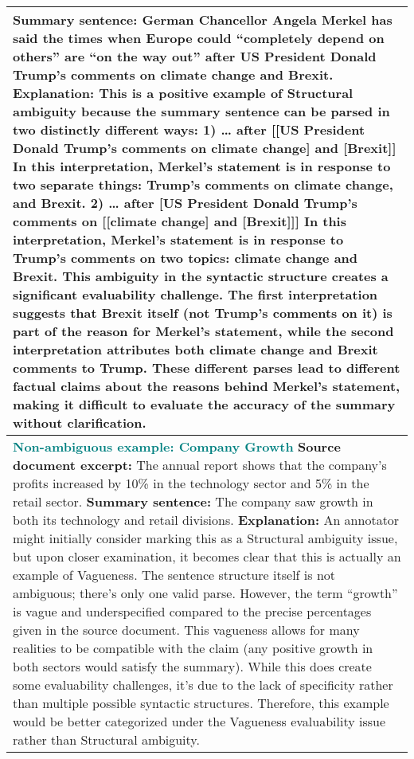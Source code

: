 \begin{table*}
\begin{tabular}{@{}p{14cm}@{}}
\newline
\textbf{Summary sentence:}
German Chancellor Angela Merkel has said the times when Europe could “completely depend on others” are “on the way out” after US President Donald Trump’s comments on climate change and Brexit.
\newline
\textbf{Explanation:}
This is a positive example of Structural ambiguity because the summary sentence can be parsed in two distinctly different ways: 1) … after [[US President Donald Trump’s comments on climate change] and [Brexit]] In this interpretation, Merkel’s statement is in response to two separate things: Trump’s comments on climate change, and Brexit. 2) … after [US President Donald Trump’s comments on [[climate change] and [Brexit]]] In this interpretation, Merkel’s statement is in response to Trump’s comments on two topics: climate change and Brexit. This ambiguity in the syntactic structure creates a significant evaluability challenge. The first interpretation suggests that Brexit itself (not Trump’s comments on it) is part of the reason for Merkel’s statement, while the second interpretation attributes both climate change and Brexit comments to Trump. These different parses lead to different factual claims about the reasons behind Merkel’s statement, making it difficult to evaluate the accuracy of the summary without clarification.
\\
\midrule
\textbf{\textcolor{teal}{Non-ambiguous example: Company Growth}}
\newline
\textbf{Source document excerpt:}
The annual report shows that the company’s profits increased by 10\% in the technology sector and 5\% in the retail sector.
\newline
\textbf{Summary sentence:}
The company saw growth in both its technology and retail divisions.
\newline
\textbf{Explanation:}
An annotator might initially consider marking this as a Structural ambiguity issue, but upon closer examination, it becomes clear that this is actually an example of Vagueness. The sentence structure itself is not ambiguous; there’s only one valid parse. However, the term “growth” is vague and underspecified compared to the precise percentages given in the source document. This vagueness allows for many realities to be compatible with the claim (any positive growth in both sectors would satisfy the summary). While this does create some evaluability challenges, it’s due to the lack of specificity rather than multiple possible syntactic structures. Therefore, this example would be better categorized under the Vagueness evaluability issue rather than Structural ambiguity.

\end{tabular}
\end{table*}
